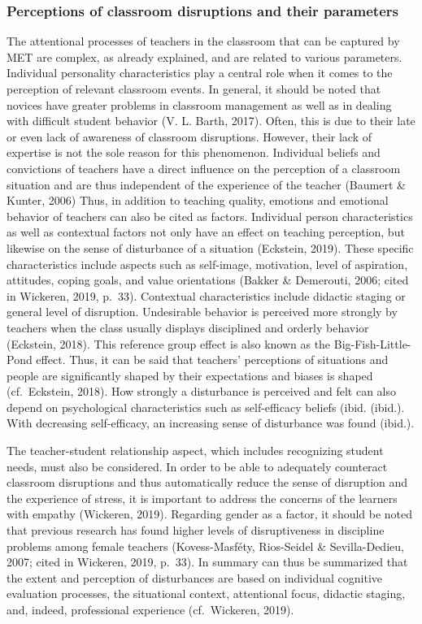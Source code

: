 \documentclass[
  man]{apa6}
\begin{document}
\subsubsection{Perceptions of classroom disruptions and their parameters}\label{perceptions-of-classroom-disruptions-and-their-parameters}

The attentional processes of teachers in the classroom that can be captured by MET are complex, as already explained, and are related to various parameters. Individual personality characteristics play a central role when it comes to the perception of relevant classroom events. In general, it should be noted that novices have greater problems in classroom management as well as in dealing with difficult student behavior (V. L. Barth, 2017). Often, this is due to their late or even lack of awareness of classroom disruptions. However, their lack of expertise is not the sole reason for this phenomenon. Individual beliefs and convictions of teachers have a direct influence on the perception of a classroom situation and are thus independent of the experience of the teacher (Baumert \& Kunter, 2006) Thus, in addition to teaching quality, emotions and emotional behavior of teachers can also be cited as factors. Individual person characteristics as well as contextual factors not only have an effect on teaching perception, but likewise on the sense of disturbance of a situation (Eckstein, 2019). These specific characteristics include aspects such as self-image, motivation, level of aspiration, attitudes, coping goals, and value orientations (Bakker \& Demerouti, 2006; cited in Wickeren, 2019, p.~33). Contextual characteristics include didactic staging or general level of disruption. Undesirable behavior is perceived more strongly by teachers when the class usually displays disciplined and orderly behavior (Eckstein, 2018). This reference group effect is also known as the Big-Fish-Little-Pond effect. Thus, it can be said that teachers' perceptions of situations and people are significantly shaped by their expectations and biases is shaped (cf.~Eckstein, 2018). How strongly a disturbance is perceived and felt can also depend on psychological characteristics such as self-efficacy beliefs (ibid. (ibid.). With decreasing self-efficacy, an increasing sense of disturbance was found (ibid.).

The teacher-student relationship aspect, which includes recognizing student needs, must also be considered. In order to be able to adequately counteract classroom disruptions and thus automatically reduce the sense of disruption and the experience of stress, it is important to address the concerns of the learners with empathy (Wickeren, 2019). Regarding gender as a factor, it should be noted that previous research has found higher levels of disruptiveness in discipline problems among female teachers (Kovess-Masféty, Rios-Seidel \& Sevilla-Dedieu, 2007; cited in Wickeren, 2019, p.~33). In summary can thus be summarized that the extent and perception of disturbances are based on individual cognitive evaluation processes, the situational context, attentional focus, didactic staging, and, indeed, professional experience (cf.~Wickeren, 2019).
\end{document}
